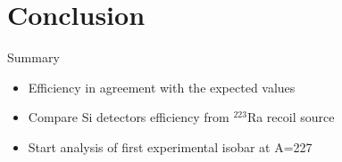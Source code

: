 \documentclass[10pt]{beamer}
\begin{document}
\section{Conclusion}
\begin{frame}{Summary}
	\centering
	\begin{itemize}
		\item Efficiency in agreement with the expected values
		\item Compare Si detectors efficiency from $^{223}$Ra recoil source
		\item Start analysis of first experimental isobar at A=227
		\
	\end{itemize}
\end{frame}
\end{document}
